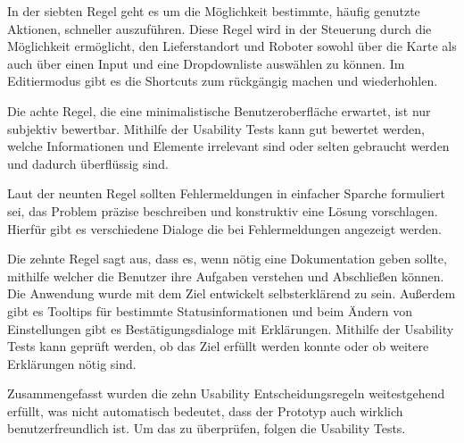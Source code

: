 In der siebten Regel geht es um die Möglichkeit bestimmte, häufig genutzte Aktionen, schneller auszuführen. Diese Regel wird in der Steuerung durch die Möglichkeit ermöglicht, den Lieferstandort und Roboter sowohl über die Karte als auch über einen Input und eine Dropdownliste auswählen zu können. Im Editiermodus gibt es die Shortcuts zum rückgängig machen und wiederhohlen.

Die achte Regel, die eine minimalistische Benutzeroberfläche erwartet, ist nur subjektiv bewertbar. Mithilfe der Usability Tests kann gut bewertet werden, welche Informationen und Elemente irrelevant sind oder selten gebraucht werden und dadurch überflüssig sind.

Laut der neunten Regel sollten Fehlermeldungen in einfacher Sparche formuliert sei, das Problem präzise beschreiben und konstruktiv eine Lösung vorschlagen. Hierfür gibt es verschiedene Dialoge die bei Fehlermeldungen angezeigt werden.

Die zehnte Regel sagt aus, dass es, wenn nötig eine Dokumentation geben sollte, mithilfe welcher die Benutzer ihre Aufgaben verstehen und Abschließen können. Die Anwendung wurde mit dem Ziel entwickelt selbsterklärend zu sein. 
Außerdem gibt es Tooltips für bestimmte Statusinformationen und beim Ändern von Einstellungen gibt es Bestätigungsdialoge mit Erklärungen. Mithilfe der Usability Tests kann geprüft werden, ob das Ziel erfüllt werden konnte oder ob weitere Erklärungen nötig sind.

Zusammengefasst wurden die zehn Usability Entscheidungsregeln weitestgehend erfüllt, was nicht automatisch bedeutet, dass der Prototyp auch wirklich benutzerfreundlich ist. Um das zu überprüfen, folgen die Usability Tests.

